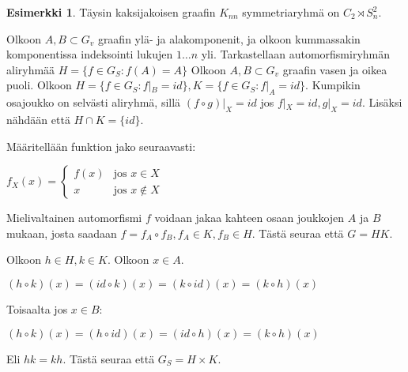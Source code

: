 \documentclass[a4paper, 12pt]{article}
\theoremstyle{definition}
\newtheorem{example}[mydef]{Esimerkki}
\theoremstyle{plain}
\begin{document}
\begin{example}
Täysin kaksijakoisen graafin $K_{nn}$ symmetriaryhmä on $C_2 \rtimes S_n^2$.

\begin{center}
\end{center}

Olkoon $A, B \subset G_v$ graafin ylä- ja alakomponenit, ja olkoon kummassakin komponentissa indeksointi lukujen $1 \dots n$ yli. Tarkastellaan automorfismiryhmän aliryhmää $H = \{f \in G_S : f(A) = A\}$
Olkoon $A, B \subset G_v$ graafin vasen ja oikea puoli. Olkoon $H = \{f \in G_S : f|_B = id\}, K = \{f \in G_S : f|_A = id\}$. Kumpikin osajoukko on selvästi aliryhmä, sillä $(f \circ g)|_X = id$ jos $f|_X = id, g|_X = id$. Lisäksi nähdään että $H \cap K = \{ id \}$.

Määritellään funktion jako seuraavasti:

\begin{center}
\begin{math}
f_X(x) =
\left\{
	\begin{array}{ll}
		f(x)  & \mbox{jos } x \in X \\
		x & \mbox{jos } x \notin X
	\end{array}
\right.
\end{math}
\end{center}

Mielivaltainen automorfismi $f$ voidaan jakaa kahteen osaan joukkojen $A$ ja $B$ mukaan, josta saadaan $f = f_A \circ f_B, f_A \in K, f_B \in H$. Tästä seuraa että $G = HK$.

Olkoon $h \in H, k \in K$. Olkoon $x \in A$. 
\begin{center}
\begin{math}
(h \circ k)(x) = (id \circ k)(x) = (k \circ id)(x) = (k \circ h)(x)
\end{math}
\end{center}
Toisaalta jos $x \in B$:
\begin{center}
\begin{math}
(h \circ k)(x) = (h \circ id)(x) = (id \circ h)(x) = (k \circ h)(x)
\end{math}
\end{center}

Eli $hk = kh$. Tästä seuraa että $G_S = H \times K$.
\end{example}
\end{document}
